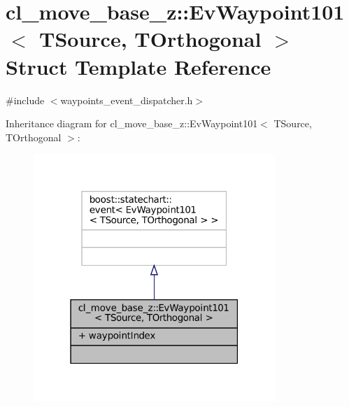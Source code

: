 \hypertarget{structcl__move__base__z_1_1EvWaypoint101}{}\section{cl\+\_\+move\+\_\+base\+\_\+z\+:\+:Ev\+Waypoint101$<$ T\+Source, T\+Orthogonal $>$ Struct Template Reference}
\label{structcl__move__base__z_1_1EvWaypoint101}


{\ttfamily \#include $<$waypoints\+\_\+event\+\_\+dispatcher.\+h$>$}



Inheritance diagram for cl\+\_\+move\+\_\+base\+\_\+z\+:\+:Ev\+Waypoint101$<$ T\+Source, T\+Orthogonal $>$\+:
\nopagebreak
\begin{figure}[H]
\begin{center}
\leavevmode
\includegraphics[width=259pt]{structcl__move__base__z_1_1EvWaypoint101__inherit__graph}
\end{center}
\end{figure}



